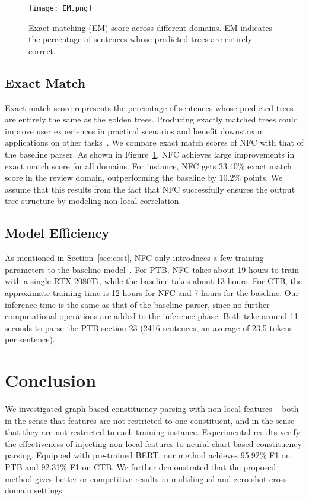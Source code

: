 \documentclass[11pt]{article}
\begin{document}
\begin{figure}[t!]
    \centering
    \texttt{[image: EM.png]}
    \caption{Exact matching (EM) score across different domains. EM indicates the percentage of sentences whose predicted trees are entirely correct.}
    \label{fig:em}
    \vspace{-0.4cm}
\end{figure}

\subsection{Exact Match}

Exact match score represents the percentage of sentences whose predicted trees are entirely the same as the golden trees. 
Producing exactly matched trees could improve user experiences in practical scenarios and benefit downstream applications on other tasks~\cite{em,kummerfeld-etal-2012-parser}.
We compare exact match scores of NFC with that of the baseline parser.
As shown in Figure~\ref{fig:em}, NFC achieves large improvements in exact match score for all domains.
For instance, NFC gets 33.40\% exact match score in the review domain, outperforming the baseline by 10.2\% points.
We assume that this results from the fact that NFC successfully ensures the output tree structure by modeling non-local correlation.

\subsection{Model Efficiency}
As mentioned in Section~\ref{sec:cost}, NFC only introduces a few training parameters to the baseline model~\cite{san-constituency}. 
For PTB, NFC takes about 19 hours to train with a single RTX 2080Ti, while the baseline takes about 13 hours. 
For CTB, the approximate training time is 12 hours for NFC and 7 hours for the baseline.
Our inference time is the same as that of the baseline parser, since no further computational operations are added to the inference phase. 
Both take around 11 seconds to parse the PTB section 23 (2416 sentences, an average of 23.5 tokens per sentence). 


\section{Conclusion}

We investigated graph-based constituency parsing with non-local features -- both in the sense that features are not restricted to one constituent, and in the sense that they are not restricted to each training instance.
Experimental results verify the effectiveness of injecting non-local features to neural chart-based constituency parsing. 
Equipped with pre-trained BERT, our method achieves 95.92\% F1 on PTB and 92.31\% F1 on CTB. We further demonstrated that the proposed method gives better or competitive results in multilingual and zero-shot cross-domain settings.
\end{document}
